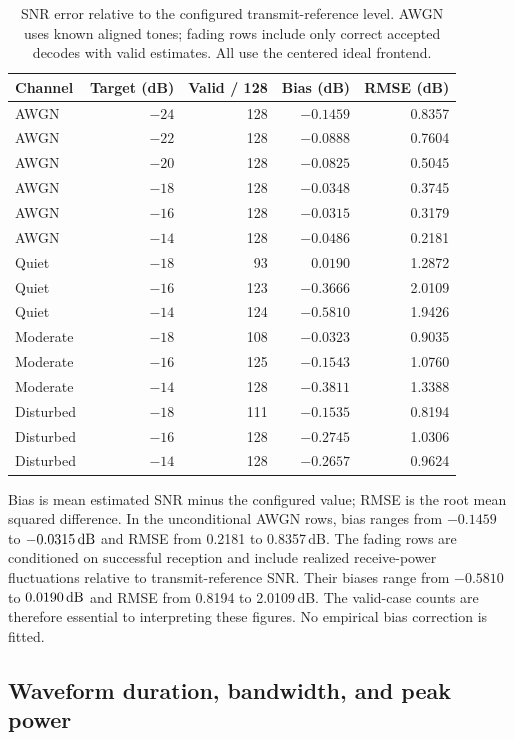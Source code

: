 \begin{table}[htbp]
\centering\small
\begin{tabular}{@{}lrrrr@{}}
\toprule
Channel & Target (dB) & Valid / 128 & Bias (dB) & RMSE (dB) \\
\midrule
AWGN & $-24$ & 128 & $-0.1459$ & 0.8357 \\
AWGN & $-22$ & 128 & $-0.0888$ & 0.7604 \\
AWGN & $-20$ & 128 & $-0.0825$ & 0.5045 \\
AWGN & $-18$ & 128 & $-0.0348$ & 0.3745 \\
AWGN & $-16$ & 128 & $-0.0315$ & 0.3179 \\
AWGN & $-14$ & 128 & $-0.0486$ & 0.2181 \\
\midrule
Quiet & $-18$ & 93 & $0.0190$ & 1.2872 \\
Quiet & $-16$ & 123 & $-0.3666$ & 2.0109 \\
Quiet & $-14$ & 124 & $-0.5810$ & 1.9426 \\
Moderate & $-18$ & 108 & $-0.0323$ & 0.9035 \\
Moderate & $-16$ & 125 & $-0.1543$ & 1.0760 \\
Moderate & $-14$ & 128 & $-0.3811$ & 1.3388 \\
Disturbed & $-18$ & 111 & $-0.1535$ & 0.8194 \\
Disturbed & $-16$ & 128 & $-0.2745$ & 1.0306 \\
Disturbed & $-14$ & 128 & $-0.2657$ & 0.9624 \\
\bottomrule
\end{tabular}
\caption{SNR error relative to the configured transmit-reference level.
AWGN uses known aligned tones; fading rows include only correct accepted
decodes with valid estimates. All use the centered ideal frontend.}
\label{tab:snrvalidation}
\end{table}

Bias is mean estimated SNR minus the configured value; RMSE is the root
mean squared difference. In the unconditional AWGN rows, bias ranges from
$-0.1459$ to $-0.0315\,\mathrm{dB}$ and RMSE from 0.2181 to 0.8357\,dB.
The fading rows are conditioned on successful reception and include
realized receive-power fluctuations relative to transmit-reference SNR.
Their biases range from $-0.5810$ to $0.0190\,\mathrm{dB}$ and RMSE from 0.8194
to 2.0109\,dB. The valid-case counts are therefore essential to interpreting
these figures. No empirical bias correction is fitted.

\subsection{Waveform duration, bandwidth, and peak power}

